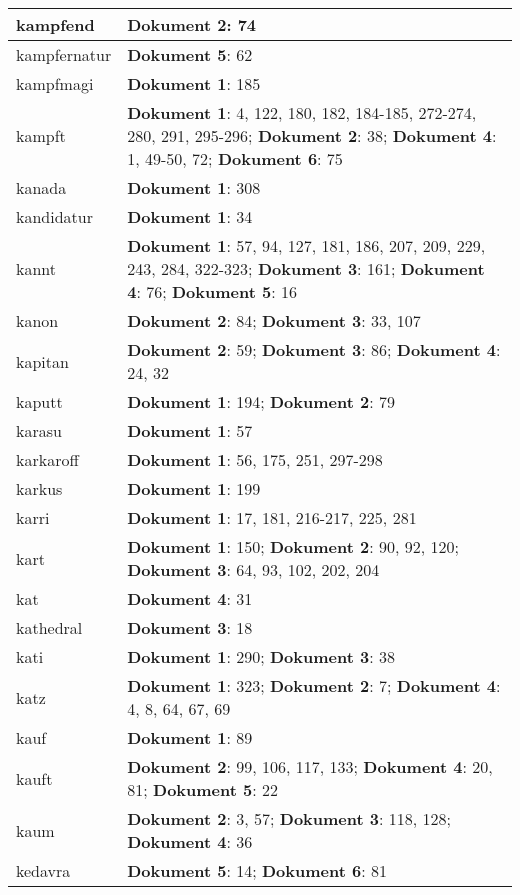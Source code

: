 \documentclass[a5paper]{article}
\begin{document}
\begin{longtable}[l]{|l|p{3in}|}
\hline
kampfend & \textbf{Dokument 2}: 74 \\
\hline
kampfernatur & \textbf{Dokument 5}: 62 \\
\hline
kampfmagi & \textbf{Dokument 1}: 185 \\
\hline
kampft & \textbf{Dokument 1}: 4, 122, 180, 182, 184-185, 272-274, 280, 291, 295-296; \textbf{Dokument 2}: 38; \textbf{Dokument 4}: 1, 49-50, 72; \textbf{Dokument 6}: 75 \\
\hline
kanada & \textbf{Dokument 1}: 308 \\
\hline
kandidatur & \textbf{Dokument 1}: 34 \\
\hline
kannt & \textbf{Dokument 1}: 57, 94, 127, 181, 186, 207, 209, 229, 243, 284, 322-323; \textbf{Dokument 3}: 161; \textbf{Dokument 4}: 76; \textbf{Dokument 5}: 16 \\
\hline
kanon & \textbf{Dokument 2}: 84; \textbf{Dokument 3}: 33, 107 \\
\hline
kapitan & \textbf{Dokument 2}: 59; \textbf{Dokument 3}: 86; \textbf{Dokument 4}: 24, 32 \\
\hline
kaputt & \textbf{Dokument 1}: 194; \textbf{Dokument 2}: 79 \\
\hline
karasu & \textbf{Dokument 1}: 57 \\
\hline
karkaroff & \textbf{Dokument 1}: 56, 175, 251, 297-298 \\
\hline
karkus & \textbf{Dokument 1}: 199 \\
\hline
karri & \textbf{Dokument 1}: 17, 181, 216-217, 225, 281 \\
\hline
kart & \textbf{Dokument 1}: 150; \textbf{Dokument 2}: 90, 92, 120; \textbf{Dokument 3}: 64, 93, 102, 202, 204 \\
\hline
kat & \textbf{Dokument 4}: 31 \\
\hline
kathedral & \textbf{Dokument 3}: 18 \\
\hline
kati & \textbf{Dokument 1}: 290; \textbf{Dokument 3}: 38 \\
\hline
katz & \textbf{Dokument 1}: 323; \textbf{Dokument 2}: 7; \textbf{Dokument 4}: 4, 8, 64, 67, 69 \\
\hline
kauf & \textbf{Dokument 1}: 89 \\
\hline
kauft & \textbf{Dokument 2}: 99, 106, 117, 133; \textbf{Dokument 4}: 20, 81; \textbf{Dokument 5}: 22 \\
\hline
kaum & \textbf{Dokument 2}: 3, 57; \textbf{Dokument 3}: 118, 128; \textbf{Dokument 4}: 36 \\
\hline
kedavra & \textbf{Dokument 5}: 14; \textbf{Dokument 6}: 81 \\

\end{longtable}
\end{document}
